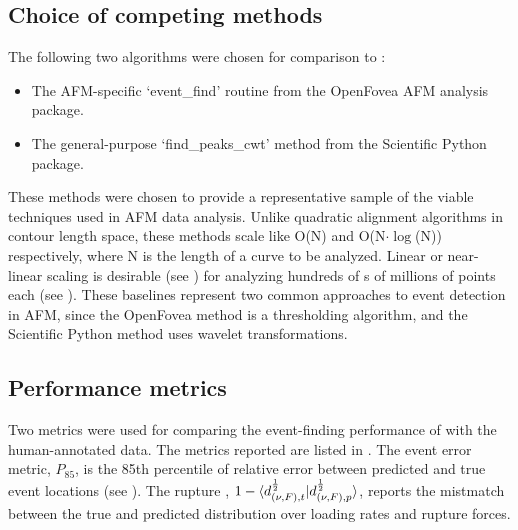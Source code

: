 \subsection{Choice of competing methods}

The following two algorithms were chosen for comparison to \name{}: 

\begin{itemize}
\item The AFM-specific `event\_find' routine from the OpenFovea AFM analysis package.
\item The general-purpose `find\_peaks\_cwt' method from the Scientific Python package.
\end{itemize}

 These methods were chosen to provide a representative sample of the viable techniques used in AFM data analysis. Unlike quadratic alignment algorithms in contour length space, these methods scale like O(N) and O(N$\cdot\log$(N)) respectively, where N is the length of a curve to be analyzed. Linear or near-linear scaling is desirable (see ) for analyzing hundreds of \fec{}s of millions of points each (see ). These baselines represent two common approaches to event detection in AFM, since the OpenFovea method is a thresholding algorithm, and the Scientific Python method uses wavelet transformations. 

\subsection{Performance metrics}

Two metrics were used for comparing the event-finding performance of \name{} with the human-annotated data. The metrics reported are listed in . The event error metric, $P_{85}$, is the 85th percentile of relative error between predicted and true event locations (see ). The rupture \BccLong{}, $1-\braket{d_{(\nu,F),t}^{\frac{1}{2}}|d_{(\nu,F),p}^{\frac{1}{2}}}$, reports the mistmatch between the true and predicted distribution over loading rates and rupture forces. 


